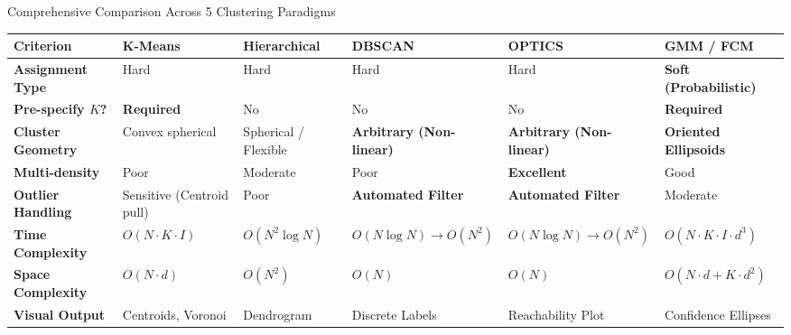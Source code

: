 \documentclass[aspectratio=169,10pt]{beamer}
\begin{document}
\begin{frame}{Comprehensive Comparison Across 5 Clustering Paradigms}
  \begin{table}[]
    \tiny
    \centering
    \begin{tabularx}{\textwidth}{l *{5}{>{\raggedright\arraybackslash}X}}
      \toprule
      \textbf{Criterion} & \textbf{K-Means} & \textbf{Hierarchical} & \textbf{DBSCAN} & \textbf{OPTICS} & \textbf{GMM / FCM} \\
      \midrule
      \textbf{Assignment Type} & Hard & Hard & Hard & Hard & \textbf{Soft (Probabilistic)} \\
      \textbf{Pre-specify $K$?} & \textbf{Required} & No & No & No & \textbf{Required} \\
      \textbf{Cluster Geometry} & Convex spherical & Spherical / Flexible & \textbf{Arbitrary (Non-linear)} & \textbf{Arbitrary (Non-linear)} & \textbf{Oriented Ellipsoids} \\
      \textbf{Multi-density} & Poor & Moderate & Poor & \textbf{Excellent} & Good \\
      \textbf{Outlier Handling} & Sensitive (Centroid pull) & Poor & \textbf{Automated Filter} & \textbf{Automated Filter} & Moderate \\
      \textbf{Time Complexity} & $O(N \cdot K \cdot I)$ & $O(N^2 \log N)$ & $O(N \log N) \to O(N^2)$ & $O(N \log N) \to O(N^2)$ & $O(N \cdot K \cdot I \cdot d^3)$ \\
      \textbf{Space Complexity} & $O(N \cdot d)$ & $O(N^2)$ & $O(N)$ & $O(N)$ & $O(N \cdot d + K \cdot d^2)$ \\
      \textbf{Visual Output} & Centroids, Voronoi & Dendrogram & Discrete Labels & Reachability Plot & Confidence Ellipses \\
      \bottomrule
    \end{tabularx}
  \end{table}
\end{frame}
\end{document}
